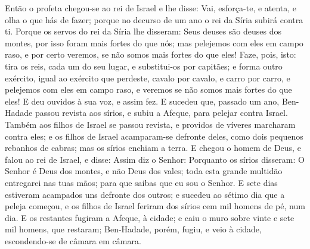 Então o profeta chegou-se ao rei de Israel e lhe disse: Vai,
esforça-te, e atenta, e olha o que hás de fazer; porque no decurso
de um ano o rei da Síria subirá contra ti. Porque os servos
do rei da Síria lhe disseram: Seus deuses são deuses dos montes, por
isso foram mais fortes do que nós; mas pelejemos com eles em campo
raso, e por certo veremos, se não somos mais fortes do que eles!
Faze, pois, isto: tira os reis, cada um do seu lugar, e
substitui-os por capitães; e forma outro exército, igual ao
exército que perdeste, cavalo por cavalo, e carro por carro, e
pelejemos com eles em campo raso, e veremos se não somos mais fortes
do que eles! E deu ouvidos à sua voz, e assim fez. E sucedeu
que, passado um ano, Ben-Hadade passou revista aos sírios, e subiu a
Afeque, para pelejar contra Israel. Também aos filhos de
Israel se passou revista, e providos de víveres marcharam contra
eles; e os filhos de Israel acamparam-se defronte deles, como dois
pequenos rebanhos de cabras; mas os sírios enchiam a terra. E
chegou o homem de Deus, e falou ao rei de Israel, e disse: Assim diz
o Senhor: Porquanto os sírios disseram: O Senhor é Deus dos montes,
e não Deus dos vales; toda esta grande multidão entregarei nas tuas
mãos; para que saibas que eu sou o Senhor. E sete dias
estiveram acampados uns defronte dos outros; e sucedeu ao sétimo dia
que a peleja começou, e os filhos de Israel feriram dos sírios cem
mil homens de pé, num dia. E os restantes fugiram a Afeque, à
cidade; e caiu o muro sobre vinte e sete mil homens, que restaram;
Ben-Hadade, porém, fugiu, e veio à cidade, escondendo-se de câmara
em câmara.

